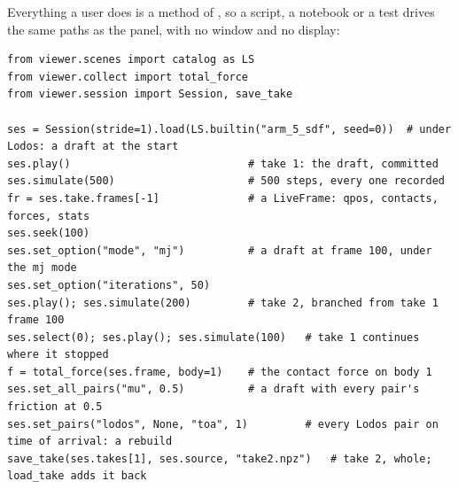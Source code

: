 Everything a user does is a method of , so a script, a notebook or a test drives the same paths as the panel, with no window and no display:

\begin{lstlisting}
from viewer.scenes import catalog as LS
from viewer.collect import total_force
from viewer.session import Session, save_take

ses = Session(stride=1).load(LS.builtin("arm_5_sdf", seed=0))  # under Lodos: a draft at the start
ses.play()                            # take 1: the draft, committed
ses.simulate(500)                     # 500 steps, every one recorded
fr = ses.take.frames[-1]              # a LiveFrame: qpos, contacts, forces, stats
ses.seek(100)
ses.set_option("mode", "mj")          # a draft at frame 100, under the mj mode
ses.set_option("iterations", 50)
ses.play(); ses.simulate(200)         # take 2, branched from take 1 frame 100
ses.select(0); ses.play(); ses.simulate(100)   # take 1 continues where it stopped
f = total_force(ses.frame, body=1)    # the contact force on body 1
ses.set_all_pairs("mu", 0.5)          # a draft with every pair's friction at 0.5
ses.set_pairs("lodos", None, "toa", 1)         # every Lodos pair on time of arrival: a rebuild
save_take(ses.takes[1], ses.source, "take2.npz")   # take 2, whole; load_take adds it back
\end{lstlisting}

